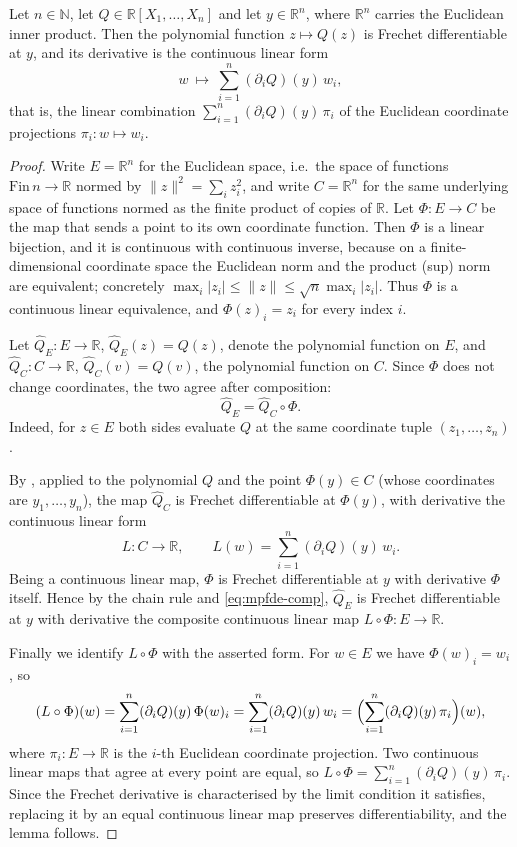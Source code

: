 \begin{lemma}
Let $n\in\mathbb{N}$, let $Q\in\mathbb{R}[X_1,\dots,X_n]$ and let
$y\in\mathbb{R}^n$, where $\mathbb{R}^n$ carries the Euclidean inner product.
Then the polynomial function $z\mapsto Q(z)$ is Frechet differentiable at $y$,
and its derivative is the continuous linear form
\[
  w\ \longmapsto\ \sum_{i=1}^{n}(\partial_iQ)(y)\,w_i ,
\]
that is, the linear combination $\sum_{i=1}^{n}(\partial_iQ)(y)\,\pi_i$ of the
Euclidean coordinate projections $\pi_i\colon w\mapsto w_i$.
\end{lemma}
\begin{proof}
Write $E=\mathbb{R}^n$ for the Euclidean space, i.e.\ the space of functions
$\mathrm{Fin}\,n\to\mathbb{R}$ normed by $\|z\|^2=\sum_i z_i^2$, and write
$C=\mathbb{R}^n$ for the same underlying space of functions normed as the finite
product of copies of $\mathbb{R}$. Let $\Phi\colon E\to C$ be the map that sends
a point to its own coordinate function. Then $\Phi$ is a linear bijection, and
it is continuous with continuous inverse, because on a finite-dimensional
coordinate space the Euclidean norm and the product (sup) norm are equivalent;
concretely $\max_i|z_i|\le\|z\|\le\sqrt{n}\max_i|z_i|$. Thus $\Phi$ is a
continuous linear equivalence, and $\Phi(z)_i=z_i$ for every index $i$.

Let $\widehat{Q}_E\colon E\to\mathbb{R}$, $\widehat{Q}_E(z)=Q(z)$, denote the
polynomial function on $E$, and $\widehat{Q}_C\colon C\to\mathbb{R}$,
$\widehat{Q}_C(v)=Q(v)$, the polynomial function on $C$. Since $\Phi$ does not
change coordinates, the two agree after composition:
\begin{equation}\label{eq:mpfde-comp}
  \widehat{Q}_E=\widehat{Q}_C\circ\Phi .
\end{equation}
Indeed, for $z\in E$ both sides evaluate $Q$ at the same coordinate tuple
$(z_1,\dots,z_n)$.

By , applied to the polynomial $Q$ and the point
$\Phi(y)\in C$ (whose coordinates are $y_1,\dots,y_n$), the map
$\widehat{Q}_C$ is Frechet differentiable at $\Phi(y)$, with derivative the
continuous linear form
\[
  L\colon C\to\mathbb{R},\qquad L(w)=\sum_{i=1}^{n}(\partial_iQ)(y)\,w_i .
\]
Being a continuous linear map, $\Phi$ is Frechet differentiable at $y$ with
derivative $\Phi$ itself. Hence by the chain rule and \eqref{eq:mpfde-comp},
$\widehat{Q}_E$ is Frechet differentiable at $y$ with derivative the composite
continuous linear map $L\circ\Phi\colon E\to\mathbb{R}$.

Finally we identify $L\circ\Phi$ with the asserted form. For $w\in E$ we have
$\Phi(w)_i=w_i$, so
\[
  (L\circ\Phi)(w)=\sum_{i=1}^{n}(\partial_iQ)(y)\,\Phi(w)_i
  =\sum_{i=1}^{n}(\partial_iQ)(y)\,w_i
  =\Bigl(\sum_{i=1}^{n}(\partial_iQ)(y)\,\pi_i\Bigr)(w),
\]
where $\pi_i\colon E\to\mathbb{R}$ is the $i$-th Euclidean coordinate
projection. Two continuous linear maps that agree at every point are equal, so
$L\circ\Phi=\sum_{i=1}^{n}(\partial_iQ)(y)\,\pi_i$. Since the Frechet derivative
is characterised by the limit condition it satisfies, replacing it by an equal
continuous linear map preserves differentiability, and the lemma follows.
\end{proof}
